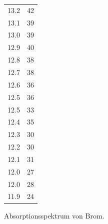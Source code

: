 \begin{figure}
{\begin{tabular}{c c}
    13.2 & 42 \\
    13.1 & 39 \\
    13.0 & 39 \\
    12.9 & 40 \\
    12.8 & 38 \\
    12.7 & 38 \\
    12.6 & 36 \\
    12.5 & 36 \\
    12.5 & 33 \\
    12.4 & 35 \\
    12.3 & 30 \\
    12.2 & 30 \\
    12.1 & 31 \\
    12.0 & 27 \\
    12.0 & 28 \\
    11.9 & 24 \\
    \bottomrule
  \end{tabular}
  }
  \caption{Absorptionsspektrum von Brom.}
  \label{fig:4}
\end{figure}

